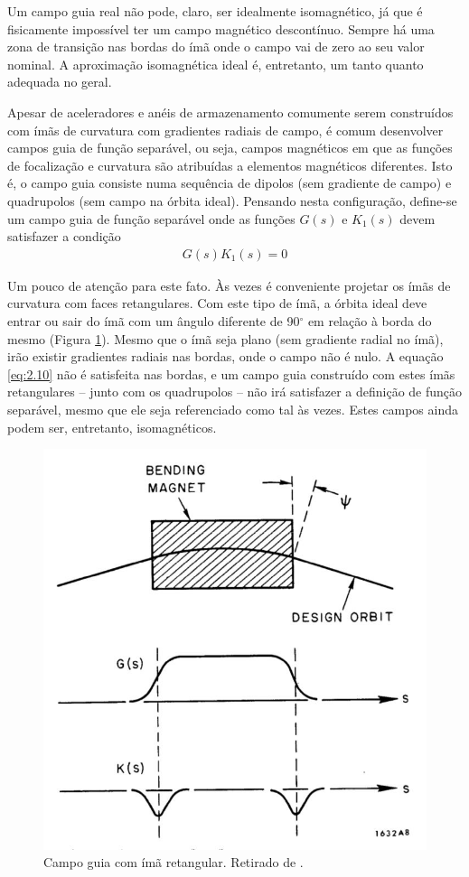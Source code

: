 Um campo guia real não pode, claro, ser idealmente isomagnético, já que é fisicamente impossível ter um campo magnético descontínuo. Sempre há uma zona de transição nas bordas do ímã onde o campo vai de zero ao seu valor nominal. A aproximação isomagnética ideal é, entretanto, um tanto quanto adequada no geral.

Apesar de aceleradores e anéis de armazenamento comumente serem construídos com ímãs de curvatura com gradientes radiais de campo, é comum desenvolver campos guia de função separável, ou seja, campos magnéticos em que as funções de focalização e curvatura são atribuídas a elementos magnéticos diferentes. Isto é, o campo guia consiste numa sequência de dipolos (sem gradiente de campo) e quadrupolos (sem campo na órbita ideal). Pensando nesta configuração, define-se um campo guia de função separável onde as funções $G(s)$ e $K_1(s)$ devem satisfazer a condição
\begin{align}
	G(s)K_1(s) = 0\label{eq:2.10}
\end{align}

Um pouco de atenção para este fato. Às vezes é conveniente projetar os ímãs de curvatura com faces retangulares. Com este tipo de ímã, a órbita ideal deve entrar ou sair do ímã com um ângulo diferente de 90$^\circ$ em relação à borda do mesmo (Figura \ref{fig:fig8}). Mesmo que o ímã seja plano (sem gradiente radial no ímã), irão existir gradientes radiais nas bordas, onde o campo não é nulo. A equação \eqref{eq:2.10} não é satisfeita nas bordas, e um campo guia construído com estes ímãs retangulares -- junto com os quadrupolos -- não irá satisfazer a definição de função separável, mesmo que ele seja referenciado como tal às vezes. Estes campos ainda podem ser, entretanto, isomagnéticos. 

\begin{figure}[!htb]
	\centering
	\includegraphics[width=0.6\linewidth]{./Figuras/fig8.jpeg}
	\caption{Campo guia com ímã retangular. Retirado de \cite{sands1970physics}.}
	\label{fig:fig8}
\end{figure}